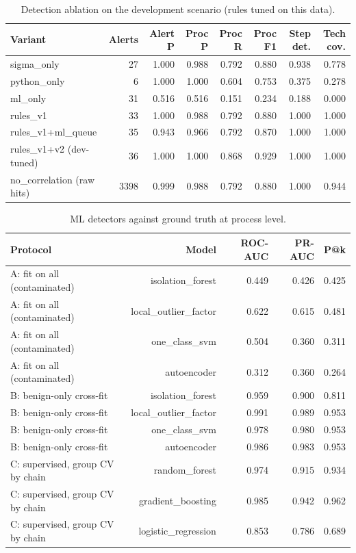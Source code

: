 \begin{table}[t]
\centering\small
\caption{Detection ablation on the development scenario (rules tuned on this data).}\label{tab:ablation}
\begin{tabular}{lrrrrrrr}
\toprule
Variant & Alerts & Alert P & Proc P & Proc R & Proc F1 & Step det. & Tech cov. \\
\midrule
sigma\_only & 27 & 1.000 & 0.988 & 0.792 & 0.880 & 0.938 & 0.778 \\
python\_only & 6 & 1.000 & 1.000 & 0.604 & 0.753 & 0.375 & 0.278 \\
ml\_only & 31 & 0.516 & 0.516 & 0.151 & 0.234 & 0.188 & 0.000 \\
rules\_v1 & 33 & 1.000 & 0.988 & 0.792 & 0.880 & 1.000 & 1.000 \\
rules\_v1+ml\_queue & 35 & 0.943 & 0.966 & 0.792 & 0.870 & 1.000 & 1.000 \\
rules\_v1+v2 (dev-tuned) & 36 & 1.000 & 1.000 & 0.868 & 0.929 & 1.000 & 1.000 \\
no\_correlation (raw hits) & 3398 & 0.999 & 0.988 & 0.792 & 0.880 & 1.000 & 0.944 \\
\bottomrule
\end{tabular}
\end{table}

\begin{table}[t]
\centering\small
\caption{ML detectors against ground truth at process level.}\label{tab:ml}
\begin{tabular}{lrrrr}
\toprule
Protocol & Model & ROC-AUC & PR-AUC & P@k \\
\midrule
A: fit on all (contaminated) & isolation\_forest & 0.449 & 0.426 & 0.425 \\
A: fit on all (contaminated) & local\_outlier\_factor & 0.622 & 0.615 & 0.481 \\
A: fit on all (contaminated) & one\_class\_svm & 0.504 & 0.360 & 0.311 \\
A: fit on all (contaminated) & autoencoder & 0.312 & 0.360 & 0.264 \\
B: benign-only cross-fit & isolation\_forest & 0.959 & 0.900 & 0.811 \\
B: benign-only cross-fit & local\_outlier\_factor & 0.991 & 0.989 & 0.953 \\
B: benign-only cross-fit & one\_class\_svm & 0.978 & 0.980 & 0.953 \\
B: benign-only cross-fit & autoencoder & 0.986 & 0.983 & 0.953 \\
C: supervised, group CV by chain & random\_forest & 0.974 & 0.915 & 0.934 \\
C: supervised, group CV by chain & gradient\_boosting & 0.985 & 0.942 & 0.962 \\
C: supervised, group CV by chain & logistic\_regression & 0.853 & 0.786 & 0.689 \\
\bottomrule
\end{tabular}
\end{table}

